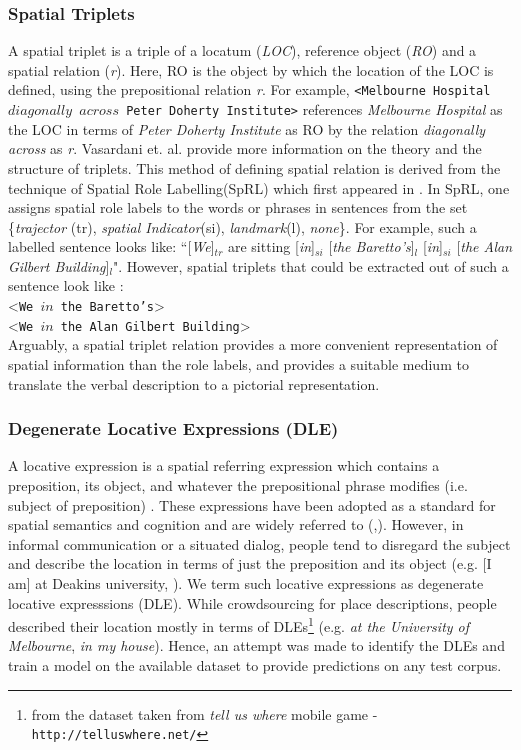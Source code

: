 \documentclass{acm_proc_article-sp}
\begin{document}
\subsubsection{Spatial Triplets}
A spatial triplet is a triple of a locatum (\textit{LOC}), reference object (\textit{RO}) and a spatial relation (\textit{r}). Here, RO is the object by which the location of the LOC is defined, using the prepositional relation \textit{r}. For example, \texttt{<Melbourne Hospital $diagonally$ $across$ Peter Doherty Institute>} references \textit{Melbourne Hospital} as the LOC in terms of \textit{Peter Doherty Institute} as RO by the relation \textit{diagonally across} as \textit{r}. Vasardani et. al. \cite{maria:descriptions} provide more information on the theory and the structure of triplets. This method of defining spatial relation is derived from the technique of Spatial Role Labelling(SpRL) which first appeared in \cite{Kordjamshidi:labelling}. In SpRL, one assigns spatial role labels to the words or phrases in sentences from the set \{\textit{trajector} (tr), \textit{spatial Indicator}(si), \textit{landmark}(l), \textit{none}\}. For example, such a labelled sentence looks like:
``[\textit{We}]$_{tr}$ are sitting [\textit{in}]$_{si}$ [\textit{the Baretto's}]$_l$ [\textit{in}]$_{si}$ [\textit{the Alan Gilbert Building}]$_{l}$". However, spatial triplets that could be extracted out of such a sentence look like : \\<\texttt{We ${in}$ the Baretto's}> \\<\texttt{We ${in}$ the Alan Gilbert Building}>\\ 
Arguably, a spatial triplet relation provides a more convenient representation of spatial information than the role labels, and provides a suitable medium to translate the verbal description to a pictorial representation. 
\subsubsection{Degenerate Locative Expressions (DLE)}
\label{DLE}
A locative expression is a spatial referring expression which contains a preposition, its object, and whatever the prepositional phrase modifies (i.e. subject of preposition) \cite{herskovits:pragmatics}. These expressions have been adopted as a standard for spatial semantics and cognition and are widely referred to (\cite{olivier:semantics},\cite{zlatev:semantics}). However, in informal communication or a situated dialog, people tend to disregard the subject and describe the location in terms of just the preposition and its object (e.g. [I am] at Deakins university, ). We term such locative expressions as degenerate locative expresssions (DLE). While crowdsourcing for place descriptions, people described their location mostly in terms of DLEs\footnote{from the dataset taken from \textit{tell us where} mobile game - \texttt{http://telluswhere.net/}} (e.g. \textit{at the University of Melbourne}, \textit{in my house}). Hence, an attempt was made to identify the DLEs and train a model on the available dataset to provide predictions on any test corpus.
\end{document}
